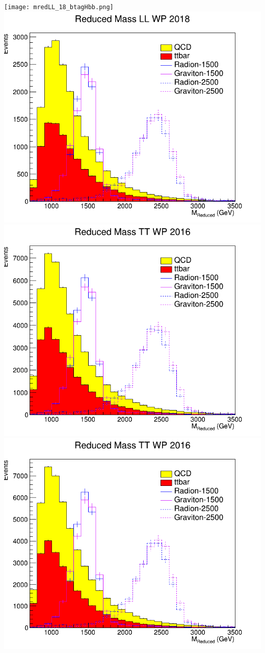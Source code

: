 \texttt{[image: mredLL\_18\_btagHbb.png]}
\includegraphics[width=1\textwidth]{mredLL_18_deepTagMD_HbbvsQCD.png}
\includegraphics[width=1\textwidth]{mredTT_16_btagHbb.png}
\includegraphics[width=1\textwidth]{mredTT_16_deepTagMD_HbbvsQCD.png}
